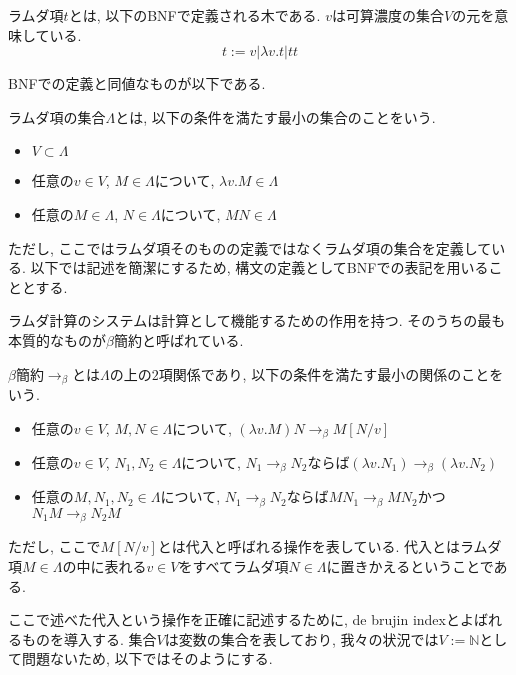 \documentclass{ltjsarticle}
\begin{document}
\begin{defn}
 ラムダ項$t$とは, 以下のBNFで定義される木である. $v$は可算濃度の集合$V$の元を意味している.
 \[
 t := v | \lambda v. t | t t
 \]
\end{defn}

BNFでの定義と同値なものが以下である.

\begin{defn}
 ラムダ項の集合$\Lambda$とは, 以下の条件を満たす最小の集合のことをいう.
 \begin{itemize}
  \item $V \subset \Lambda$
  \item 任意の$v \in V$, $M \in \Lambda$について, $\lambda v. M \in \Lambda$
  \item 任意の$M \in \Lambda$, $N \in \Lambda$について, $M N \in \Lambda$
 \end{itemize}
\end{defn}

ただし, ここではラムダ項そのものの定義ではなくラムダ項の集合を定義している. 以下では記述を簡潔にするため, 構文の定義としてBNFでの表記を用いることとする.

ラムダ計算のシステムは計算として機能するための作用を持つ. そのうちの最も本質的なものが$\beta$簡約と呼ばれている.

\begin{defn}
 $\beta$簡約$\rightarrow_{\beta}$とは$\Lambda$の上の$2$項関係であり, 以下の条件を満たす最小の関係のことをいう.
 \begin{itemize}
  \item 任意の$v \in V$, $M, N \in \Lambda$について, $(\lambda v. M) N \rightarrow_\beta M[N/v]$
  \item 任意の$v \in V$, $N_1, N_2 \in \Lambda$について, $N_1 \rightarrow_\beta N_2$ならば$(\lambda v. N_1) \rightarrow_\beta (\lambda v. N_2)$
  \item 任意の$M, N_1, N_2 \in \Lambda$について, $N_1 \rightarrow_\beta N_2$ならば$M N_1 \rightarrow_\beta M N_2$かつ$N_1 M \rightarrow_\beta N_2 M$
 \end{itemize}
 ただし, ここで$M[N/v]$とは代入と呼ばれる操作を表している. 代入とはラムダ項$M \in \Lambda$の中に表れる$v \in V$をすべてラムダ項$N \in \Lambda$に置きかえるということである.
\end{defn}

ここで述べた代入という操作を正確に記述するために, de brujin indexとよばれるものを導入する.
集合$V$は変数の集合を表しており, 我々の状況では$V := \mathbb{N}$として問題ないため, 以下ではそのようにする.
\end{document}
